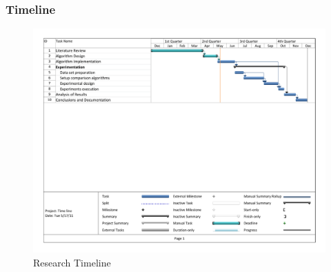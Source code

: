 \begin{frame}
\frametitle{Timeline}
\begin{figure}
	\centering
		\includegraphics[width=1\textwidth]{../Images/Timeline.pdf}
	\caption{Research Timeline}
	\label{fig:Timeline}
\end{figure}
\end{frame}